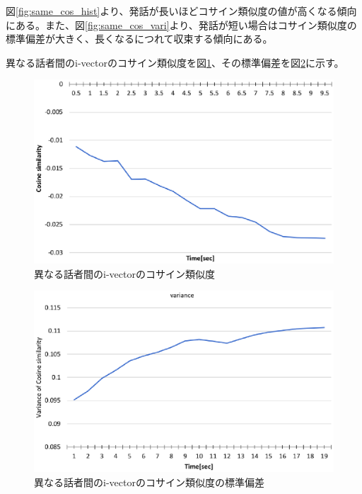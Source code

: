 図\ref{fig:same_cos_hist}より、発話が長いほどコサイン類似度の値が高くなる傾向にある。また、図\ref{fig:same_cos_vari}より、発話が短い場合はコサイン類似度の標準偏差が大きく、長くなるにつれて収束する傾向にある。\par


\vspace{0.2in}\par
異なる話者間のi-vectorのコサイン類似度を図\ref{fig:other_cos_hist}、その標準偏差を図\ref{fig:other_cos_vari}に示す。\par

\begin{figure}[H]
  \begin{center}
    \includegraphics[scale=0.8]{./figure/other_cos_hist.eps}
  \end{center}
  \caption{異なる話者間のi-vectorのコサイン類似度 \label{fig:other_cos_hist}}
\end{figure}

\begin{figure}[H]
  \begin{center}
    \includegraphics[scale=0.8]{./figure/other_cos_vari.eps}
  \end{center}
  \caption{異なる話者間のi-vectorのコサイン類似度の標準偏差 \label{fig:other_cos_vari}}
\end{figure}

